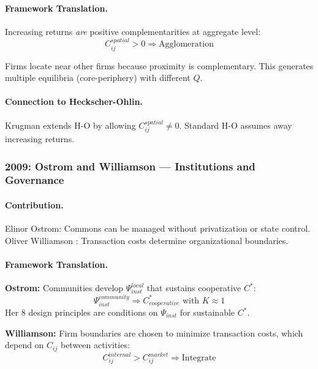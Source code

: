 \paragraph{Framework Translation.}
Increasing returns \emph{are} positive complementarities at aggregate level:
\begin{equation}
  C_{ij}^{spatial} > 0 \Rightarrow \text{Agglomeration}
\end{equation}

Firms locate near other firms because proximity is complementary.
This generates multiple equilibria (core-periphery) with different $Q$.

\paragraph{Connection to Heckscher-Ohlin.}
Krugman extends H-O by allowing $C_{ij}^{spatial} \neq 0$.
Standard H-O assumes away increasing returns.

\subsubsection{2009: Ostrom and Williamson --- Institutions and Governance}

\paragraph{Contribution.}
Elinor Ostrom: Commons can be managed without privatization or state control.
Oliver Williamson \citep{williamson1985}: Transaction costs determine organizational boundaries.

\paragraph{Framework Translation.}
\textbf{Ostrom:} Communities develop $\Psi_{inst}^{local}$ that sustains cooperative $C^*$:
\begin{equation}
  \Psi_{inst}^{community} \Rightarrow C^*_{cooperative} \text{ with } K \approx 1
\end{equation}
Her 8 design principles are conditions on $\Psi_{inst}$ for sustainable $C^*$.

\textbf{Williamson:} Firm boundaries are chosen to minimize transaction costs,
which depend on $C_{ij}$ between activities:
\begin{equation}
  C_{ij}^{internal} > C_{ij}^{market} \Rightarrow \text{Integrate}
\end{equation}

